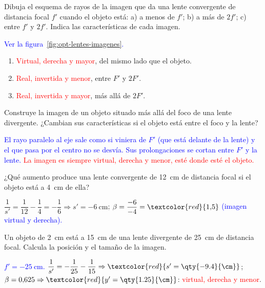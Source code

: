 \begin{exercise}
    Dibuja el esquema de rayos de la imagen que da una lente convergente de distancia focal \(f'\) cuando el objeto está:
    a) a menos de \(f'\); b) a más de \(2f'\); c) entre \(f'\) y \(2f'\). Indica las características de cada imagen.
    \begin{solu}
        \textcolor{blue}{Ver la figura~\ref{fig:opt-lentes-imagenes}.}
        \begin{enumerate}[label=\letraminuscula]
            \item \textcolor{red}{Virtual, derecha y mayor}, del mismo lado que el objeto.
            \item \textcolor{red}{Real, invertida y menor}, entre \(F'\) y \(2F'\).
            \item \textcolor{red}{Real, invertida y mayor}, más allá de \(2F'\).
        \end{enumerate}
    \end{solu}
\end{exercise}

\begin{exercise}
    Construye la imagen de un objeto situado más allá del foco de una lente divergente. ¿Cambian sus características si el
    objeto está entre el foco y la lente?
    \begin{solu}
        \textcolor{blue}{El rayo paralelo al eje sale como si viniera de \(F'\) (que está delante de la lente) y el que pasa por
        el centro no se desvía. Sus prolongaciones se cortan entre \(F'\) y la lente.}
        \textcolor{red}{La imagen es siempre virtual, derecha y menor, esté donde esté el objeto.}
    \end{solu}
\end{exercise}

\begin{exercise}
    ¿Qué aumento produce una lente convergente de \qty{12}{\cm} de distancia focal si el objeto está a \qty{4}{\cm} de ella?
    \begin{solu}
        \(\dfrac{1}{s'} = \dfrac{1}{12} - \dfrac{1}{4} = -\dfrac{1}{6} \Rightarrow s' = \qty{-6}{\cm}\);
        \(\beta = \dfrac{-6}{-4} = \textcolor{red}{1{,}5}\) \textcolor{blue}{(imagen virtual y derecha).}
    \end{solu}
\end{exercise}

\begin{exercise}
    Un objeto de \qty{2}{\cm} está a \qty{15}{\cm} de una lente divergente de \qty{25}{\cm} de distancia focal. Calcula la
    posición y el tamaño de la imagen.
    \begin{solu}
        \textcolor{blue}{\(f' = \qty{-25}{\cm}\).} \(\dfrac{1}{s'} = -\dfrac{1}{25} - \dfrac{1}{15} \Rightarrow \textcolor{red}{s' = \qty{-9.4}{\cm}}\);
        \(\beta = 0{,}625 \Rightarrow \textcolor{red}{y' = \qty{1.25}{\cm}}\): \textcolor{red}{virtual, derecha y menor}.
    \end{solu}
\end{exercise}

